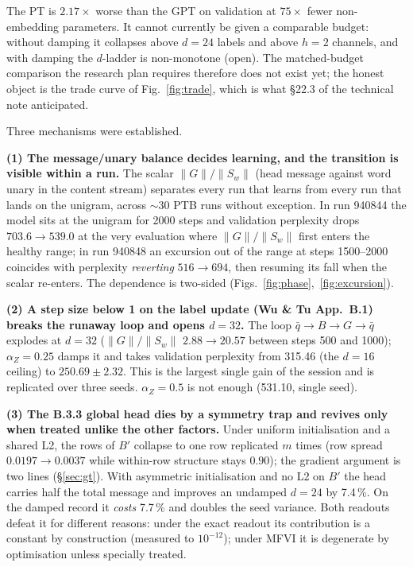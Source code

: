 \documentclass[10pt,a4paper]{article}
\newcommand{\msgu}{\ensuremath{\lVert G\rVert/\lVert S_w\rVert}}
\newcommand{\qbar}{\ensuremath{\bar q}}
\newcommand{\pmm}[2]{\ensuremath{#1 \pm #2}}
\begin{document}
The PT is $2.17\times$ worse than the GPT on validation at $75\times$ fewer non-embedding
parameters. It cannot currently be given a comparable budget: without damping it collapses
above $d=24$ labels and above $h=2$ channels, and with damping the $d$-ladder is
non-monotone (open). The matched-budget comparison the research plan requires therefore does
not exist yet; the honest object is the trade curve of Fig.~\ref{fig:trade}, which is what
\S22.3 of the technical note anticipated.

Three mechanisms were established.

\textbf{(1) The message/unary balance decides learning, and the transition is visible within
a run.} The scalar $\msgu$ (head message against word unary in the content stream) separates
every run that learns from every run that lands on the unigram, across ${\sim}30$ PTB runs
without exception. In run 940844 the model sits at the unigram for 2000 steps and validation
perplexity drops $703.6 \to 539.0$ at the very evaluation where \msgu{} first enters the
healthy range; in run 940848 an excursion out of the range at steps 1500--2000 coincides
with perplexity \emph{reverting} $516 \to 694$, then resuming its fall when the scalar
re-enters. The dependence is two-sided (Figs.~\ref{fig:phase},~\ref{fig:excursion}).

\textbf{(2) A step size below 1 on the label update (Wu \& Tu App.~B.1) breaks the runaway
loop and opens $d=32$.} The loop $\qbar \to B \to G \to \qbar$ explodes at $d=32$ (\msgu{}
$2.88 \to 20.57$ between steps 500 and 1000); $\alpha_Z=0.25$ damps it and takes validation
perplexity from 315.46 (the $d{=}16$ ceiling) to \pmm{250.69}{2.32}. This is the largest
single gain of the session and is replicated over three seeds. $\alpha_Z=0.5$ is not enough
(531.10, single seed).

\textbf{(3) The B.3.3 global head dies by a symmetry trap and revives only when treated
unlike the other factors.} Under uniform initialisation and a shared L2, the rows of $B'$
collapse to one row replicated $m$ times (row spread $0.0197 \to 0.0037$ while within-row
structure stays $0.90$); the gradient argument is two lines (\S\ref{sec:gt}). With
asymmetric initialisation and no L2 on $B'$ the head carries half the total message and
improves an undamped $d=24$ by 7.4\,\%. On the damped record it \emph{costs} 7.7\,\% and
doubles the seed variance. Both readouts defeat it for different reasons: under the exact
readout its contribution is a constant by construction (measured to $10^{-12}$); under MFVI
it is degenerate by optimisation unless specially treated.
\end{document}
